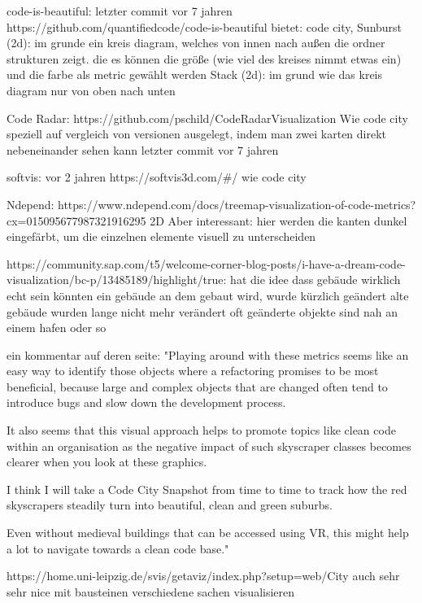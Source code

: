 code-is-beautiful: letzter commit vor 7 jahren
https://github.com/quantifiedcode/code-is-beautiful
bietet: code city, 
Sunburst (2d): im grunde ein kreis diagram, welches von  innen nach außen die ordner strukturen zeigt. die es können die größe (wie viel des kreises nimmt etwas ein) und die farbe als metric gewählt werden
Stack (2d): im grund wie das kreis diagram nur von oben nach unten


Code Radar:
https://github.com/pschild/CodeRadarVisualization
Wie code city speziell auf vergleich von versionen ausgelegt, indem man zwei karten direkt nebeneinander sehen kann
letzter commit vor 7 jahren


softvis:
vor 2 jahren
https://softvis3d.com/#/
wie code city


Ndepend:
https://www.ndepend.com/docs/treemap-visualization-of-code-metrics?cx=015095677987321916295%
2D
Aber interessant: hier werden die kanten dunkel eingefärbt, um die einzelnen elemente visuell zu unterscheiden


https://community.sap.com/t5/welcome-corner-blog-posts/i-have-a-dream-code-visualization/bc-p/13485189/highlight/true:
hat die idee dass gebäude wirklich echt sein könnten
ein gebäude an dem gebaut wird, wurde kürzlich geändert
alte gebäude wurden lange nicht mehr verändert
oft geänderte objekte sind nah an einem hafen oder so

ein kommentar auf deren seite:
"Playing around with these metrics seems like an easy way to identify those objects where a refactoring promises to be most beneficial, because large and complex objects that are changed often tend to introduce bugs and slow down the development process.

It also seems that this visual approach helps to promote topics like clean code within an organisation as the negative impact of such skyscraper classes becomes clearer when you look at these graphics.

I think I will take a Code City Snapshot from time to time to track how the red skyscrapers steadily turn into beautiful, clean and green suburbs.

Even without medieval buildings that can be accessed using VR, this might help a lot to navigate towards a clean code base."


https://home.uni-leipzig.de/svis/getaviz/index.php?setup=web/City%
auch sehr sehr nice
mit bausteinen verschiedene sachen visualisieren


